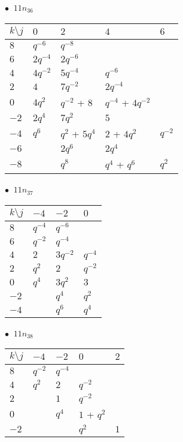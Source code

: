 \begin{minipage}{\linewidth}
$\bullet\ $ $11n_{36}$ \vspace{0.5em} \\
\begin{tabular}{l|llll}
$k \setminus j$ & $0$ & $2$ & $4$ & $6$ \\
\hline
$8$ & $q^{-6}$ & $q^{-8}$ &  &  \\
$6$ & $2q^{-4}$ & $2q^{-6}$ &  &  \\
$4$ & $4q^{-2}$ & $5q^{-4}$ & $q^{-6}$ &  \\
$2$ & $4$ & $7q^{-2}$ & $2q^{-4}$ &  \\
$0$ & $4q^{2}$ & $q^{-2}$ + $8$ & $q^{-4}$ + $4q^{-2}$ &  \\
$-2$ & $2q^{4}$ & $7q^{2}$ & $5$ &  \\
$-4$ & $q^{6}$ & $q^{2}$ + $5q^{4}$ & $2$ + $4q^{2}$ & $q^{-2}$ \\
$-6$ &  & $2q^{6}$ & $2q^{4}$ &  \\
$-8$ &  & $q^{8}$ & $q^{4}$ + $q^{6}$ & $q^{2}$ \\
\end{tabular}
\vspace{2em}
\end{minipage}
%
\begin{minipage}{\linewidth}
$\bullet\ $ $11n_{37}$ \vspace{0.5em} \\
\begin{tabular}{l|lll}
$k \setminus j$ & $-4$ & $-2$ & $0$ \\
\hline
$8$ & $q^{-4}$ & $q^{-6}$ &  \\
$6$ & $q^{-2}$ & $q^{-4}$ &  \\
$4$ & $2$ & $3q^{-2}$ & $q^{-4}$ \\
$2$ & $q^{2}$ & $2$ & $q^{-2}$ \\
$0$ & $q^{4}$ & $3q^{2}$ & $3$ \\
$-2$ &  & $q^{4}$ & $q^{2}$ \\
$-4$ &  & $q^{6}$ & $q^{4}$ \\
\end{tabular}
\vspace{2em}
\end{minipage}
%
\begin{minipage}{\linewidth}
$\bullet\ $ $11n_{38}$ \vspace{0.5em} \\
\begin{tabular}{l|llll}
$k \setminus j$ & $-4$ & $-2$ & $0$ & $2$ \\
\hline
$8$ & $q^{-2}$ & $q^{-4}$ &  &  \\
$4$ & $q^{2}$ & $2$ & $q^{-2}$ &  \\
$2$ &  & $1$ & $q^{-2}$ &  \\
$0$ &  & $q^{4}$ & $1$ + $q^{2}$ &  \\
$-2$ &  &  & $q^{2}$ & $1$ \\
\end{tabular}
\vspace{2em}
\end{minipage}
